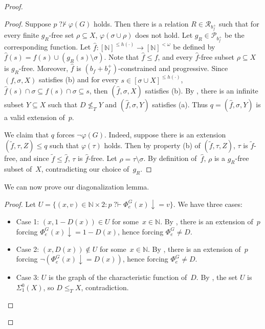 \documentclass{article}
\def\P{\mathcal{P}}
\newcommand{\qvdash}{\operatorname{{?}{\vdash}}}
\newcommand{\nqvdash}{\operatorname{{?}{\nvdash}}}
\newcommand{\NN}[0]{\mathbb{N}}
\numberwithin{theorem}{section}
\newtheorem{lemma}[theorem]{Lemma}
\newcommand{\R}{\mathcal{R}}
\begin{document}
\begin{proof}
\begin{proof}
Suppose $p \nqvdash \varphi(G)$ holds. Then there is a relation $R \in \R_{b_f^{+}}$ such that for every finite $g_R$-free set $\rho \subseteq X$, $\varphi(\sigma \cup \rho)$ does not hold. Let $g_R \in \P_{b_f^{+}}$ be the corresponding function. Let $\hat{f} : [\NN]^{\leq h(\cdot)} \to [\NN]^{<\omega}$ be defined by $\hat{f}(s) = f(s) \cup (g_R(s) \setminus \sigma)$. Note that $\hat{f} \leq f$, and every $\hat{f}$-free subset $\rho \subseteq X$ is $g_R$-free. Moreover, $\hat{f}$ is $(b_f + b_f^{+})$-constrained and progressive. Since $(f, \sigma, X)$ satisfies (b) and for every $s \in [\sigma \cup X]^{\leq h(\cdot)}$, $\hat{f}(s)\cap \sigma\subseteq f(s)\cap \sigma\subseteq s$, then $(\hat{f}, \sigma, X)$ satisfies (b). By , there is an infinite subset $Y \subseteq X$ such that $D \not \leq_T Y$ and $(\hat{f}, \sigma, Y)$ satisfies (a). Thus $q = (\hat{f}, \sigma, Y)$ is a valid extension of~$p$. 

We claim that $q$ forces $\neg \varphi(G)$. Indeed, suppose there is an extension $(\tilde{f}, \tau, Z) \leq q$ such that $\varphi(\tau)$ holds. Then by property (b) of  $(\tilde{f}, \tau, Z)$, $\tau$ is $\tilde{f}$-free, and since $\tilde{f} \leq \hat{f}$, $\tau$ is $\hat{f}$-free. Let $\rho = \tau \setminus \sigma$. By definition of~$\hat{f}$, $\rho$ is a $g_R$-free subset of~$X$, contradicting our choice of~$g_R$.
\end{proof}

We can now prove our diagonalization lemma.

\begin{proof}
Let $U = \{ (x, v) \in \NN \times 2 : p \qvdash \Phi^G_e(x) \downarrow = v \}$. We have three cases:
\begin{itemize}
    \item Case 1: $(x, 1-D(x)) \in U$ for some~$x \in \NN$. By , there is an extension of~$p$ forcing $\Phi^G_e(x)\downarrow = 1-D(x)$, hence forcing $\Phi_e^G \neq D$.
    \item Case 2: $(x, D(x)) \not \in U$ for some~$x \in \NN$. By , there is an extension of~$p$ forcing $\neg (\Phi^G_e(x)\downarrow = D(x))$, hence forcing $\Phi_e^G \neq D$.
    \item Case 3: $U$ is the graph of the characteristic function of~$D$. By , the set $U$ is $\Sigma^0_1(X)$, so $D \leq_T X$, contradiction.
\end{itemize}
\end{proof}


\end{proof}
\end{document}
